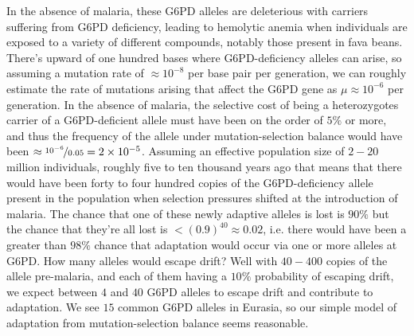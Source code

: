 {In the absence of malaria, these G6PD alleles are deleterious with
carriers suffering from G6PD deficiency,
leading to hemolytic anemia when individuals are exposed to a variety of different compounds, notably those present in fava beans.
There's upward of one hundred bases where G6PD-deficiency alleles can arise, so assuming a mutation rate of $\approx 10^{-8}$ per base pair per
generation, we can roughly estimate the rate of mutations arising that affect the G6PD gene as $\mu \approx
10^{-6}$ per generation. In the absence of malaria, the selective cost of being a heterozygotes carrier of a G6PD-deficient allele must have been on the order of
$5\%$ or more, and thus the frequency of the allele under
mutation-selection balance would have been $\approx \nicefrac{10^{-6}}{0.05} =2
\times 10^{-5}$. Assuming an effective population size of  $2-20$ million
individuals, roughly five to ten thousand years ago that means that
there would have been forty to four hundred copies of the G6PD-deficiency
allele present in the population when selection pressures shifted at the introduction of malaria. The
chance that one of these newly adaptive alleles is lost
is $90\%$ but the chance that they're all lost is $<(0.9)^{40}\approx 0.02$, i.e. there would have been a
greater than $98\%$ chance that adaptation would occur via one or more
alleles at G6PD. How many alleles would escape drift? Well with $40 - 400$
copies of the allele pre-malaria, and each of them having a $10\%$
probability of escaping drift, we expect between $4$ and $40$ G6PD
alleles to escape drift and contribute to adaptation. We see $15$ common G6PD
alleles in Eurasia, so our simple model of adaptation from
mutation-selection balance seems reasonable.   

}

